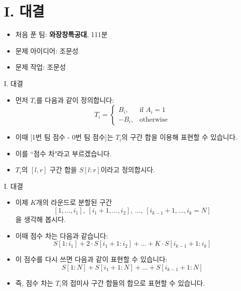 \def\probno{I}
\def\probtitle{대결}

\section{\probno{}. \probtitle{}}

\begin{frame} %
    \sectiontitle{\probno{}}{\probtitle{}}
    \begin{itemize}
        \item 처음 푼 팀: \textbf{와장창특공대}, 111분
        \item 문제 아이디어: 조문성
        \item 문제 작업: 조문성
    \end{itemize}
\end{frame}

\begin{frame}{\probno{}. \probtitle{}}
    \begin{itemize}
        \item 먼저 $T_i$를 다음과 같이 정의합니다: 
        \[
        T_i = \begin{cases}
        B_i, & \text{if } A_i = 1 \\
        -B_i, & \text{otherwise}
        \end{cases}
        \]
        \item 이때 [1번 팀 점수 - 0번 팀 점수]는 $T_i$의 구간 합을 이용해 표현할 수 있습니다.
        \item 이를 ``점수 차"라고 부르겠습니다.
        \item $T_i$의 $[l, r]$ 구간 합을 $S[l : r]$이라고 정의합시다.
    \end{itemize}
\end{frame}

\begin{frame}{\probno{}. \probtitle{}}
    \begin{itemize}
        \item 이제 $K$개의 라운드로 분할된 구간 
        \[
        [1, \dots, i_1],\ [i_1 + 1, \dots, i_2],\ \dots,\ [i_{k-1} + 1, \dots, i_k = N]
        \]
        을 생각해 봅시다.
        \item 이때 점수 차는 다음과 같습니다:  
        \[
        S[1 : i_1] + 2 \cdot S[i_1 + 1 : i_2] + \dots + K \cdot S[i_{k-1} + 1 : i_k]
        \]
        \item 이 점수를 다시 쓰면 다음과 같이 표현할 수 있습니다:  
        \[
        S[1 : N] + S[i_1 + 1 : N] + \dots + S[i_{k-1} + 1 : N]
        \]
        \item 즉, 점수 차는 $T_i$의 접미사 구간 합들의 합으로 표현할 수 있습니다.
    \end{itemize}
\end{frame}

